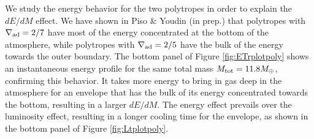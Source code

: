 \documentclass[apj]{emulateapj}
\newcommand{\delad}{\nabla_{\rm ad}}
\begin{document}
We study the energy behavior for the two polytropes in order to explain the $dE/dM$ effect. We have shown in Piso \& Youdin (in prep.) that polytropes with $\delad=2/7$ have most of the energy concentrated at the bottom of the atmosphere, while polytropes with $\delad=2/5$ have the bulk of the energy towards the outer boundary. The bottom panel of Figure \ref{fig:ETrplotpoly} shows an instantaneous energy profile for the same total mass $M_{\rm{tot}} = 11.8 M_{\oplus}$, confirming this behavior. It takes more energy to bring in gas deep in the atmosphere for an envelope that has the bulk of its energy concentrated towards the bottom,  resulting in a larger $dE/dM$. The energy effect prevails over the luminosity effect, resulting in a longer cooling time for the envelope, as shown in the bottom panel of Figure \ref{fig:Ltplotpoly}.






\end{document}
